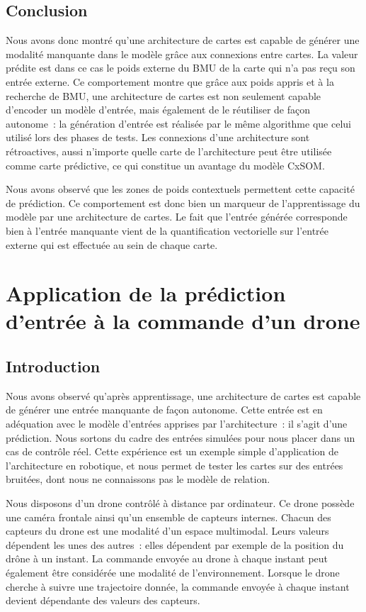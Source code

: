 \documentclass[../main]{subfiles}
\begin{document}
\subsection{Conclusion}

Nous avons donc montré qu'une architecture de cartes est capable de générer une modalité manquante dans le modèle grâce aux connexions entre cartes. La valeur prédite est dans ce cas le poids externe du BMU de la carte qui n'a pas reçu son entrée externe.
Ce comportement montre que grâce aux poids appris et à la recherche de BMU, une architecture de cartes est non seulement capable d'encoder un modèle d'entrée, mais également de le réutiliser de façon autonome~: la génération d'entrée est réalisée par le même algorithme que celui utilisé lors des phases de tests.
Les connexions d'une architecture sont rétroactives, aussi n'importe quelle carte de l'architecture peut être utilisée comme carte prédictive, ce qui constitue un avantage du modèle CxSOM.

Nous avons observé que les zones de poids contextuels permettent cette capacité de prédiction. Ce comportement est donc bien un marqueur de l'apprentissage du modèle par une architecture de cartes. Le fait que l'entrée générée corresponde bien à l'entrée manquante vient de la quantification vectorielle sur l'entrée externe qui est effectuée au sein de chaque carte.

\section{Application de la prédiction d'entrée à la commande d'un drone}

\subsection{Introduction}

Nous avons observé qu'après apprentissage, une architecture de cartes est capable de générer une entrée manquante de façon autonome. Cette entrée est en adéquation avec le modèle d'entrées apprises par l'architecture~: il s'agit d'une prédiction.
Nous sortons du cadre des entrées simulées pour nous placer dans un cas de contrôle réel. Cette expérience est un exemple simple d'application de l'architecture en robotique, et nous permet de tester les cartes sur des entrées bruitées, dont nous ne connaissons pas le modèle de relation.

Nous disposons d'un drone contrôlé à distance par ordinateur. Ce drone possède une caméra frontale ainsi qu'un ensemble de capteurs internes. Chacun des capteurs du drone est une modalité d'un espace multimodal. Leurs valeurs dépendent les unes des autres~: elles dépendent par exemple de la position du drône à un instant.
La commande envoyée au drone à chaque instant peut également être considérée une modalité de l'environnement. 
Lorsque le drone cherche à suivre une trajectoire donnée, la commande envoyée à chaque instant devient dépendante des valeurs des capteurs.
\end{document}
